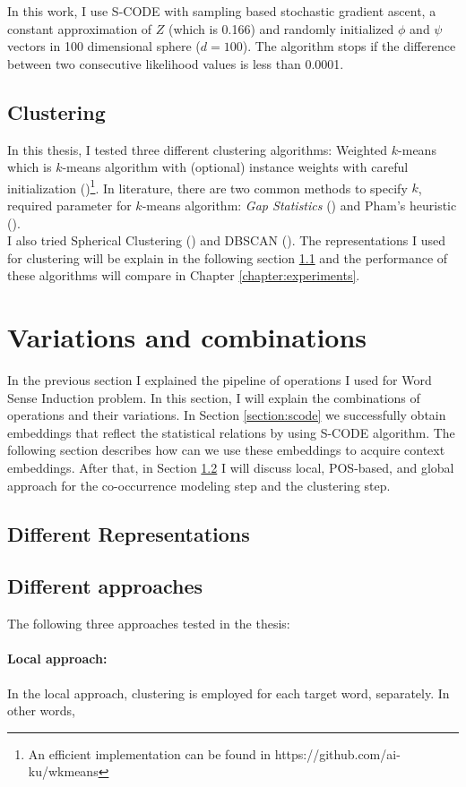 In this work, I use S-CODE with sampling based stochastic gradient ascent, a constant approximation of $Z$ (which is 0.166) and randomly initialized $\phi$ and $\psi$ vectors in 100 dimensional sphere ($d = 100$). The algorithm stops if the difference between two consecutive likelihood values is less than 0.0001.


\subsection{Clustering}
\label{section:clustering}

In this thesis, I tested three different clustering algorithms: Weighted $k$-means which is $k$-means algorithm with (optional) instance weights with careful initialization (\cite{arthur2007k})\footnote{An efficient implementation can be found in https://github.com/ai-ku/wkmeans}. In literature, there are two common methods to specify $k$, required parameter for $k$-means algorithm: \emph{Gap Statistics} (\cite{tibshirani00estimating}) and Pham’s heuristic (\cite{pham2005selection}). \\

I also tried Spherical Clustering (\cite{shi2000normalized}) and DBSCAN (\cite{ester1996density}). The representations I used for clustering will be explain in the following section \ref{section:representations} and the performance of these algorithms will compare in Chapter \ref{chapter:experiments}.


\section{Variations and combinations}
\label{section:variations}

In the previous section I explained the pipeline of operations I used for Word Sense Induction problem. In this section, I will explain the combinations of operations and their variations. In Section \ref{section:scode} we successfully obtain embeddings that reflect the statistical relations by using S-CODE algorithm. The following section describes how can we use these embeddings to acquire context embeddings. After that, in Section \ref{section:diff-approaches} I will discuss local, POS-based, and global approach for the co-occurrence modeling step and the clustering step. 


\subsection{Different Representations}
\label{section:representations}



\subsection{Different approaches}
\label{section:diff-approaches}

The following three approaches tested in the thesis:

\paragraph{Local approach:} In the local approach, clustering is employed for each target word, separately. In other words, 
